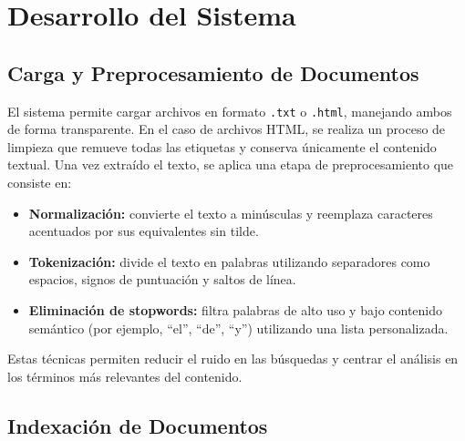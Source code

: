 \documentclass[9pt,letterpaper,onecolumn]{rho-class/rho}
\begin{document}


\section{Desarrollo del Sistema}

\subsection{Carga y Preprocesamiento de Documentos}

El sistema permite cargar archivos en formato \texttt{.txt} o \texttt{.html}, manejando ambos de forma transparente. En el caso de archivos HTML, se realiza un proceso de limpieza que remueve todas las etiquetas y conserva únicamente el contenido textual. Una vez extraído el texto, se aplica una etapa de preprocesamiento que consiste en:

\begin{itemize}
    \item \textbf{Normalización:} convierte el texto a minúsculas y reemplaza caracteres acentuados por sus equivalentes sin tilde.
    \item \textbf{Tokenización:} divide el texto en palabras utilizando separadores como espacios, signos de puntuación y saltos de línea.
    \item \textbf{Eliminación de stopwords:} filtra palabras de alto uso y bajo contenido semántico (por ejemplo, “el”, “de”, “y”) utilizando una lista personalizada.
\end{itemize}

Estas técnicas permiten reducir el ruido en las búsquedas y centrar el análisis en los términos más relevantes del contenido.

\subsection{Indexación de Documentos}
\end{document}
